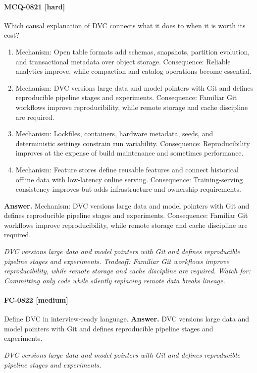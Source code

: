 \paragraph{MCQ-0821 [hard]} Which causal explanation of DVC connects what it does to when it is worth its cost?
\begin{enumerate}[label=\Alph*.]
\item Mechanism: Open table formats add schemas, snapshots, partition evolution, and transactional metadata over object storage. Consequence: Reliable analytics improve, while compaction and catalog operations become essential.
\item Mechanism: DVC versions large data and model pointers with Git and defines reproducible pipeline stages and experiments. Consequence: Familiar Git workflows improve reproducibility, while remote storage and cache discipline are required.
\item Mechanism: Lockfiles, containers, hardware metadata, seeds, and deterministic settings constrain run variability. Consequence: Reproducibility improves at the expense of build maintenance and sometimes performance.
\item Mechanism: Feature stores define reusable features and connect historical offline data with low-latency online serving. Consequence: Training-serving consistency improves but adds infrastructure and ownership requirements.
\end{enumerate}
\noindent\textbf{Answer.} Mechanism: DVC versions large data and model pointers with Git and defines reproducible pipeline stages and experiments. Consequence: Familiar Git workflows improve reproducibility, while remote storage and cache discipline are required.
\par\textit{DVC versions large data and model pointers with Git and defines reproducible pipeline stages and experiments. Tradeoff: Familiar Git workflows improve reproducibility, while remote storage and cache discipline are required. Watch for: Committing only code while silently replacing remote data breaks lineage.}
\paragraph{FC-0822 [medium]} Define DVC in interview-ready language.
\noindent\textbf{Answer.} DVC versions large data and model pointers with Git and defines reproducible pipeline stages and experiments.
\par\textit{DVC versions large data and model pointers with Git and defines reproducible pipeline stages and experiments.}
